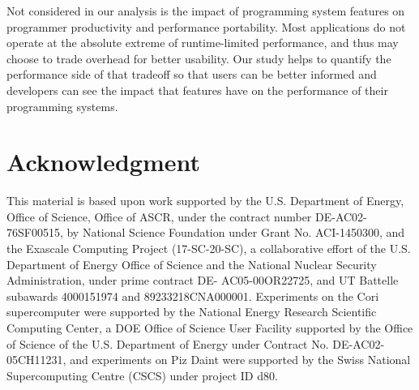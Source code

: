 Not considered in our analysis is the impact of programming system
features on programmer productivity and performance portability. Most
applications do not operate at the absolute extreme of runtime-limited
performance, and thus may choose to trade overhead for better
usability. Our study helps to quantify the performance side of that
tradeoff so that users can be better informed and developers can see
the impact that features have on the performance of their programming
systems.

\section*{Acknowledgment}

This material is based upon work supported by the U.S. Department of
Energy, Office of Science, Office of ASCR, under the contract number
DE-AC02-76SF00515, by National Science Foundation under Grant
No. ACI-1450300, and the Exascale Computing Project (17-SC-20-SC), a
collaborative effort of the U.S. Department of Energy Office of
Science and the National Nuclear Security Administration, under prime
contract DE- AC05-00OR22725, and UT Battelle subawards 4000151974 and
89233218CNA000001. Experiments on the Cori supercomputer were
supported by the National Energy Research Scientific Computing Center,
a DOE Office of Science User Facility supported by the Office of
Science of the U.S. Department of Energy under Contract
No. DE-AC02-05CH11231, and experiments on Piz Daint were supported by
the Swiss National Supercomputing Centre (CSCS) under project ID d80.
